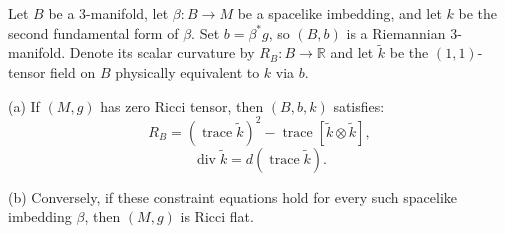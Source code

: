 Let $B$ be a 3-manifold, let $\beta: B \to M$ be a spacelike imbedding, and let $k$ be the second fundamental form of $\beta$. Set $b = \beta^* g$, so $(B,b)$ is a Riemannian 3-manifold. Denote its scalar curvature by $R_B: B \to \mathbb{R}$ and let $\tilde{k}$ be the $(1,1)$-tensor field on $B$ physically equivalent to $k$ via $b$.

(a) If $(M,g)$ has zero Ricci tensor, then $(B,b,k)$ satisfies:
$$R_B = (\operatorname{trace} \tilde{k})^2 - \operatorname{trace}[\tilde{k} \otimes \tilde{k}],$$
$$\operatorname{div} \tilde{k} = d(\operatorname{trace} \tilde{k}).$$

(b) Conversely, if these constraint equations hold for every such spacelike imbedding $\beta$, then $(M,g)$ is Ricci flat.
